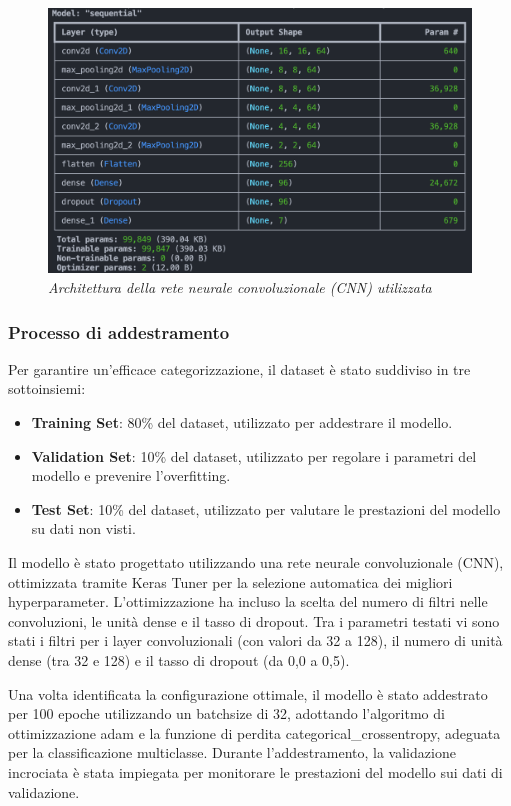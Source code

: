 \begin{figure}[ht]
    \centering
        \centering
        \includegraphics[width=0.8\linewidth]{images/cnn_architecture.png}
        \caption{\emph{Architettura della rete neurale convoluzionale (CNN) utilizzata}}
        \label{fig:cnn_architecture}
\end{figure}

\subsubsection{Processo di addestramento}
Per garantire un'efficace categorizzazione, il dataset è stato suddiviso in tre sottoinsiemi: 
\begin{itemize}
    \item \textbf{Training Set}: 80\% del dataset, utilizzato per addestrare il modello.
    \item \textbf{Validation Set}: 10\% del dataset, utilizzato per regolare i parametri del modello e prevenire l'overfitting.
    \item \textbf{Test Set}: 10\% del dataset, utilizzato per valutare le prestazioni del modello su dati non visti.
\end{itemize}
Il modello è stato progettato utilizzando una rete neurale convoluzionale (CNN), ottimizzata tramite Keras Tuner per la selezione automatica dei migliori \gls{hyperparameter}. L'ottimizzazione ha incluso la scelta del numero di filtri nelle convoluzioni, le unità dense e il tasso di dropout. Tra i parametri testati vi sono stati i filtri per i layer convoluzionali (con valori da 32 a 128), il numero di unità dense (tra 32 e 128) e il tasso di dropout (da 0,0 a 0,5).

Una volta identificata la configurazione ottimale, il modello è stato addestrato per 100 epoche utilizzando un \gls{batchsize} di 32, adottando l'algoritmo di ottimizzazione \gls{adam} e la funzione di perdita categorical\_crossentropy, adeguata per la classificazione multi\-classe. Durante l'addestramento, la validazione incrociata è stata impiegata per monitorare le prestazioni del modello sui dati di validazione.


